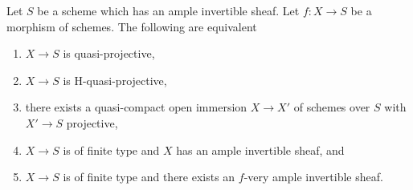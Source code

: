 \begin{lemma}
\label{lemma-quasi-projective}
Let $S$ be a scheme which has an ample invertible sheaf.
Let $f : X \to S$ be a morphism of schemes. The following are
equivalent
\begin{enumerate}
\item $X \to S$ is quasi-projective,
\item $X \to S$ is H-quasi-projective,
\item there exists a quasi-compact open immersion $X \to X'$ of schemes
over $S$ with $X' \to S$ projective,
\item $X \to S$ is of finite type and $X$ has an ample invertible
sheaf, and
\item $X \to S$ is of finite type and there exists an
$f$-very ample invertible sheaf.
\end{enumerate}
\end{lemma}

